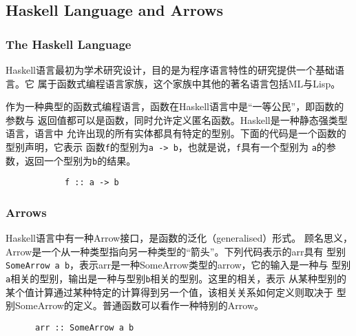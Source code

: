 \documentclass[conference]{IEEEtran}
\begin{document}
\subsection{Haskell Language and Arrows}\label{subsec:haskell-and-arrows}
\subsubsection{The Haskell Language}
Haskell语言最初为学术研究设计，目的是为程序语言特性的研究提供一个基础语言。它
属于函数式编程语言家族，这个家族中其他的著名语言包括ML与Lisp。

作为一种典型的函数式编程语言，函数在Haskell语言中是“一等公民”，即函数的参数与
返回值都可以是函数，同时允许定义匿名函数。Haskell是一种静态强类型语言，语言中
允许出现的所有实体都具有特定的型别。下面的代码是一个函数的型别声明，它表示
函数\texttt{f}的型别为\texttt{a -> b}，也就是说，\texttt{f}具有一个型别为
\texttt{a}的参数，返回一个型别为\texttt{b}的结果。
\begin{verbatim}
            f :: a -> b
\end{verbatim}

\subsubsection{Arrows}
Haskell语言中有一种Arrow接口，是函数的泛化（generalised）形式\cite{Hughes2005}。
顾名思义，Arrow是一个从一种类型指向另一种类型的“箭头”。下列代码表示的arr具有
型别\texttt{SomeArrow a b}，表示arr是一种SomeArrow类型的arrow，它的输入是一种与
型别\texttt{a}相关的型别，输出是一种与型别\texttt{b}相关的型别。这里的相关，表示
从某种型别的某个值计算通过某种特定的计算得到另一个值，该相关关系如何定义则取决于
型别SomeArrow的定义。普通函数可以看作一种特别的Arrow。
\begin{verbatim}
      arr :: SomeArrow a b
\end{verbatim}
\end{document}
